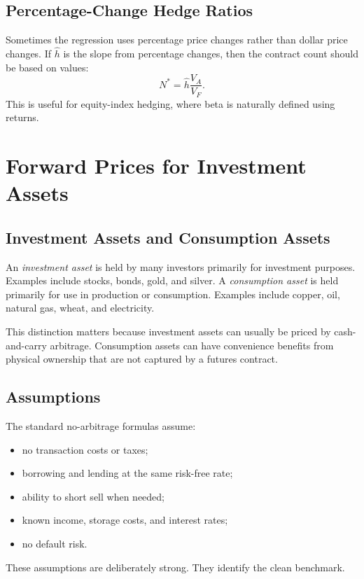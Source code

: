 \subsection{Percentage-Change Hedge Ratios}

Sometimes the regression uses percentage price changes rather than dollar price
changes. If $\hat{h}$ is the slope from percentage changes, then the contract
count should be based on values:
\[
    N^*=\hat{h}\frac{V_A}{V_F}.
\]
This is useful for equity-index hedging, where beta is naturally defined using
returns.

\section{Forward Prices for Investment Assets}

\subsection{Investment Assets and Consumption Assets}

An \emph{investment asset} is held by many investors primarily for investment
purposes. Examples include stocks, bonds, gold, and silver. A \emph{consumption
asset} is held primarily for use in production or consumption. Examples include
copper, oil, natural gas, wheat, and electricity.

This distinction matters because investment assets can usually be priced by
cash-and-carry arbitrage. Consumption assets can have convenience benefits from
physical ownership that are not captured by a futures contract.

\subsection{Assumptions}

The standard no-arbitrage formulas assume:
\begin{itemize}
    \item no transaction costs or taxes;
    \item borrowing and lending at the same risk-free rate;
    \item ability to short sell when needed;
    \item known income, storage costs, and interest rates;
    \item no default risk.
\end{itemize}
These assumptions are deliberately strong. They identify the clean benchmark.

